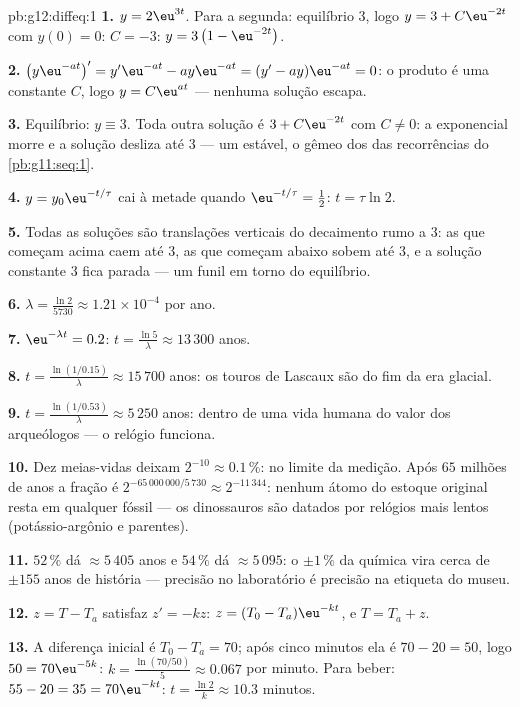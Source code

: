 \begin{solution}{pb:g12:diffeq:1}
\textbf{1.} $y = 2\eu^{3t}$. Para a segunda: equilíbrio $3$,
logo $y = 3 + C\eu^{-2t}$ com $y(0) = 0$: $C = -3$:
$y = 3\left(1 - \eu^{-2t}\right)$.

\textbf{2.} $\left(y\eu^{-at}\right)' = y'\eu^{-at} -
ay\eu^{-at} = (y' - ay)\eu^{-at} = 0$: o produto é uma
constante $C$, logo $y = C\eu^{at}$ --- nenhuma solução
escapa.

\textbf{3.} Equilíbrio: $y \equiv 3$. Toda outra solução é
$3 + C\eu^{-2t}$ com $C \neq 0$: a exponencial morre e a
solução desliza até $3$ --- um  estável, o gêmeo
 dos  das recorrências do
\cref{pb:g11:seq:1}.

\textbf{4.} $y = y_0\eu^{-t/\tau}$ cai à metade quando
$\eu^{-t/\tau} = \frac12$: $t = \tau\ln 2$.

\textbf{5.} Todas as soluções são translações verticais do
decaimento rumo a $3$: as que começam acima caem até $3$, as
que começam abaixo sobem até $3$, e a solução constante $3$
fica parada --- um funil em torno do equilíbrio.

\textbf{6.} $\lambda = \frac{\ln 2}{5730} \approx 1.21 \times
10^{-4}$ por ano.

\textbf{7.} $\eu^{-\lambda t} = 0.2$:
$t = \frac{\ln 5}{\lambda} \approx 13\,300$ anos.

\textbf{8.} $t = \frac{\ln(1/0.15)}{\lambda} \approx 15\,700$
anos: os touros de Lascaux são do fim da era glacial.

\textbf{9.} $t = \frac{\ln(1/0.53)}{\lambda} \approx 5\,250$
anos: dentro de uma vida humana do valor dos arqueólogos --- o
relógio funciona.

\textbf{10.} Dez meias-vidas deixam
$2^{-10} \approx 0.1\,\%$: no limite da medição. Após $65$
milhões de anos a fração é
$2^{-65\,000\,000/5\,730} \approx 2^{-11\,344}$: nenhum átomo
do estoque original resta em qualquer fóssil --- os dinossauros
são datados por relógios mais lentos (potássio-argônio e
parentes).

\textbf{11.} $52\,\%$ dá $\approx 5\,405$ anos e $54\,\%$ dá
$\approx 5\,095$: o $\pm 1\,\%$ da química vira cerca de
$\pm 155$ anos de história --- precisão no laboratório é
precisão na etiqueta do museu.

\textbf{12.} $z = T - T_a$ satisfaz $z' = -kz$:
$z = (T_0 - T_a)\eu^{-kt}$, e $T = T_a + z$.

\textbf{13.} A diferença inicial é $T_0 - T_a = 70$; após cinco
minutos ela é $70 - 20 = 50$, logo $50 = 70\eu^{-5k}$:
$k = \frac{\ln(70/50)}{5} \approx 0.067$ por minuto. Para
beber: $55 - 20 = 35 = 70\eu^{-kt}$:
$t = \frac{\ln 2}{k} \approx 10.3$ minutos.


\end{solution}
